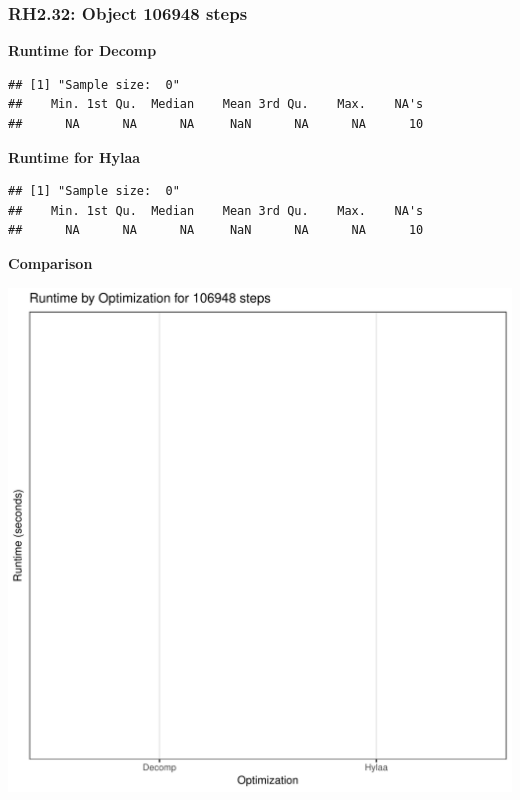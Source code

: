 \documentclass{article}\usepackage[]{graphicx}\usepackage[]{color}
\makeatletter
\def\maxwidth{ %
  \ifdim\Gin@nat@width>\linewidth
    \linewidth
  \else
    \Gin@nat@width
  \fi
}
\newenvironment{kframe}{%
 \def\at@end@of@kframe{}%
 \ifinner\ifhmode%
  \def\at@end@of@kframe{\end{minipage}}%
  \begin{minipage}{\columnwidth}%
 \fi\fi%
 \def\FrameCommand##1{\hskip\@totalleftmargin \hskip-\fboxsep
 \colorbox{shadecolor}{##1}\hskip-\fboxsep
     \hskip-\linewidth \hskip-\@totalleftmargin \hskip\columnwidth}%
 \MakeFramed {\advance\hsize-\width
   \@totalleftmargin\z@ \linewidth\hsize
   \@setminipage}}%
 {\par\unskip\endMakeFramed%
 \at@end@of@kframe}
\newenvironment{knitrout}{}{} %
\makeatother
\begin{document}
\subsubsection{RH2.32: Object 106948 steps}

 \textbf{Runtime for Decomp}
\begin{knitrout}
\color{fgcolor}\begin{kframe}
\begin{verbatim}
## [1] "Sample size:  0"
##    Min. 1st Qu.  Median    Mean 3rd Qu.    Max.    NA's 
##      NA      NA      NA     NaN      NA      NA      10
\end{verbatim}
\end{kframe}
\end{knitrout}
 \textbf{Runtime for Hylaa}
\begin{knitrout}
\color{fgcolor}\begin{kframe}
\begin{verbatim}
## [1] "Sample size:  0"
##    Min. 1st Qu.  Median    Mean 3rd Qu.    Max.    NA's 
##      NA      NA      NA     NaN      NA      NA      10
\end{verbatim}
\end{kframe}
\end{knitrout}
  
 \textbf{Comparison}
  
\begin{knitrout}
\color{fgcolor}
\includegraphics[width=\maxwidth]{figure/RH2_steps106948-1} 

\end{knitrout}
\end{document}
